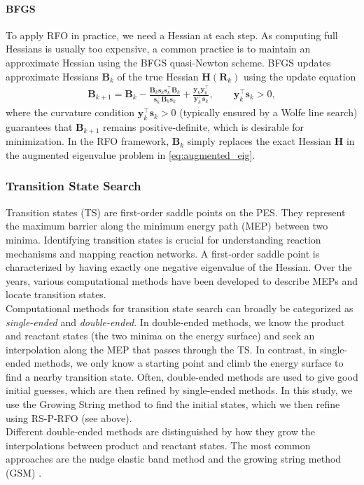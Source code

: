 \documentclass[pdflatex,sn-mathphys-num]{sn-jnl}%
\theoremstyle{thmstyleone}%
\theoremstyle{thmstyletwo}%
\theoremstyle{thmstylethree}%
\begin{document}
\begin{appendices}
\paragraph{BFGS}
\label{sec:bfgs}
To apply RFO in practice, we need a Hessian at each step. As computing full Hessians is usually too expensive, a common practice is to maintain an approximate Hessian using the BFGS quasi-Newton scheme. BFGS updates approximate Hessians $\mathbf{B}_k$ of the true Hessian $\mathbf{H}(\mathbf{R}_k)$ using the update equation
\begin{align}
    \mathbf{B}_{k+1} = \mathbf{B}_k 
    - \frac{\mathbf{B}_k \mathbf{s}_k \mathbf{s}_k^\top \mathbf{B}_k}{\mathbf{s}_k^\top \mathbf{B}_k \mathbf{s}_k}
    + \frac{\mathbf{y}_k \mathbf{y}_k^\top}{\mathbf{y}_k^\top \mathbf{s}_k},
    \qquad \mathbf{y}_k^\top \mathbf{s}_k > 0,
\end{align}
where the curvature condition $\mathbf{y}_k^\top \mathbf{s}_k>0$ (typically ensured by a Wolfe line search) guarantees that $\mathbf{B}_{k+1}$ remains positive-definite, which is desirable for minimization. In the RFO framework, $\mathbf{B}_k$ simply replaces the exact Hessian $\mathbf{H}$ in the augmented eigenvalue problem in \eqref{eq:augmented_eig}.

\subsubsection{Transition State Search \label{sec:tssearchliterature}}
Transition states (TS) are first-order saddle points on the PES. They represent the maximum barrier along the minimum energy path (MEP) between two minima. Identifying transition states is crucial for understanding reaction mechanisms and mapping reaction networks. A first-order saddle point is characterized by having exactly one negative eigenvalue of the Hessian. Over the years, various computational methods have been developed to describe MEPs and locate transition states. \\
Computational methods for transition state search can broadly be categorized as \textit{single-ended} and \textit{double-ended}. In double-ended methods, we know the product and reactant states (the two minima on the energy surface) and seek an interpolation along the MEP that passes through the TS. In contrast, in single-ended methods, we only know a starting point and climb the energy surface to find a nearby transition state. Often, double-ended methods are used to give good initial guesses, which are then refined by single-ended methods. In this study, we use the Growing String method to find the initial states, which we then refine using RS-P-RFO (see above).\\
Different double-ended methods are distinguished by how they grow the interpolations between product and reactant states. The most common approaches are the nudge elastic band method \citep{henkelman1999, henkelman2000} and the growing string method (GSM) \citep{peters2004,zimmerman2015}. 


\end{appendices}
\end{document}
